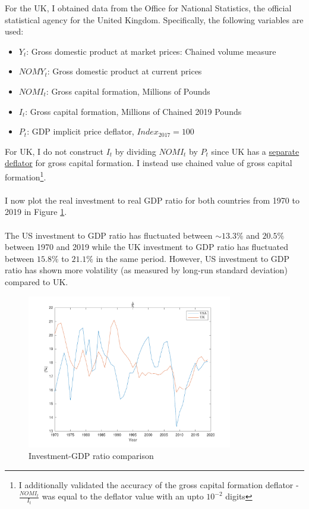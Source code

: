 \documentclass[12pt]{article}
\theoremstyle{mytheoremstyle}
\theoremstyle{mytheoremstyle}
\theoremstyle{myproblemstyle}
\begin{document}
For the UK, I obtained data from the Office for National Statistics, the official statistical agency for the United Kingdom. Specifically, the following variables are used: 

\begin{itemize}
    \item $Y_t$: Gross domestic product at market prices: Chained volume measure
    \item $NOMY_t$:  Gross domestic product at current prices
    \item $NOMI_t$: Gross capital formation, Millions of Pounds
    \item $I_t$: Gross capital formation, Millions of Chained 2019 Pounds
    \item $P_t$: GDP implicit price deflator, $Index_{2017} = 100$
\end{itemize}

\noindent For UK, I do not construct $I_t$ by dividing $NOMI_t$ by $P_t$ since UK has a \href{https://www.ons.gov.uk/economy/grossdomesticproductgdp/timeseries/ybfu/ukea}{separate deflator} for gross capital formation. I instead use chained value of gross capital formation\footnote{I additionally validated the accuracy of the gross capital formation deflator - $\frac{NOMI_t}{I_t}$ was equal to the deflator value with an upto $10^{-2}$ digits}.
\\ \\ 
\noindent I now plot the real investment to real GDP ratio for both countries from 1970 to 2019 in Figure \ref{fig:inv-gdp}. 
\\ \\ 
The US investment to GDP ratio has fluctuated between $\sim 13.3\% $ and $20.5\%$ between 1970 and 2019 while the UK investment to GDP ratio has fluctuated between $15.8\%$ to $21.1\%$ in the same period. However, US investment to GDP ratio has shown more volatility (as measured by long-run standard deviation) compared to UK.

\begin{figure}[h]
    \includegraphics[width=0.8\textwidth]{out/Investment.pdf}
    \centering
    \caption{Investment-GDP ratio comparison}
    \label{fig:inv-gdp}
\end{figure}
\end{document}
